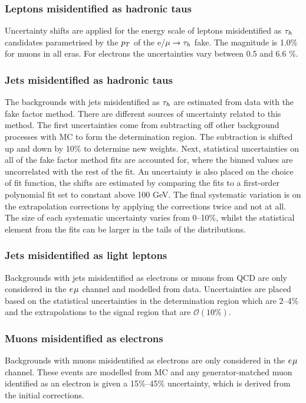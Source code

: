 \subsubsection{Leptons misidentified as hadronic taus}
Uncertainty shifts are applied for the energy scale of leptons misidentified as $\tau_{h}$ candidates parametrised by the $p_{T}$ of the e/$\mu\rightarrow\tau_{h}$ fake.
The magnitude is 1.0\% for muons in all eras. 
For electrons the uncertainties vary between 0.5 and 6.6 \%.

\subsubsection{Jets misidentified as hadronic taus}
The backgrounds with jets misidentified as $\tau_{h}$ are estimated from data with the fake factor method. 
There are different sources of uncertainty related to this method.
The first uncertainties come from subtracting off other background processes with \ac{MC} to form the determination region. 
The subtraction is shifted up and down by 10\% to determine new weights.
Next, statistical uncertainties on all of the fake factor method fits are accounted for, where the binned values are uncorrelated with the rest of the fit.
An uncertainty is also placed on the choice of fit function, the shifts are estimated by comparing the fits to a first-order polynomial fit set to constant above 100 GeV.
The final systematic variation is on the extrapolation corrections by applying the corrections twice and not at all.
The size of each systematic uncertainty varies from 0--10\%, whilst the statistical element from the fits can be larger in the tails of the distributions.

\subsubsection{Jets misidentified as light leptons}
Backgrounds with jets misidentified as electrons or muons from \ac{QCD} are only considered in the $e_{}\mu_{}$ channel and modelled from data.
Uncertainties are placed based on the statistical uncertainties in the determination region which are 2--4\% and the extrapolations to the signal region that are $\mathcal{O}(10\%)$.

\subsubsection{Muons misidentified as electrons}
Backgrounds with muons misidentified as electrons are only considered in the $e_{}\mu_{}$ channel.
These events are modelled from \ac{MC} and any generator-matched muon identified as an electron is given a 15\%--45\% uncertainty, which is derived from the initial corrections.

